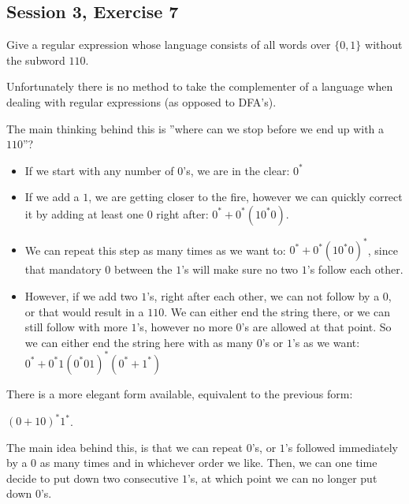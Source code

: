 \subsection{Session 3, Exercise 7}


Give a regular expression whose language consists of all words over $\{0,1\}$ without the subword $110$.


Unfortunately there is no method to take the complementer of a language when dealing with regular expressions (as opposed to DFA's).

The main thinking behind this is ''where can we stop before we end up with a $110$''?

\begin{itemize}
    \item If we start with any number of $0$'s, we are in the clear: $0^*$
    \item If we add a $1$, we are getting closer to the fire, however we can quickly correct it by adding at least one $0$ right after: $0^*+0^*(10^*0)$.
    \item We can repeat this step as many times as we want to: $0^*+0^*(10^*0)^*$, since that mandatory $0$ between the $1$'s will make sure no two $1$'s follow each other.
    \item However, if we add two $1$'s, right after each other, we can not follow by a $0$, or that would result in a $110$. We can either end the string there, or we can still follow with more $1$'s, however no more $0$'s are allowed at that point. So we can either end the string here with as many $0$'s or $1$'s as we want: $0^*+0^*1(0^*01)^*(0^*+1^*)$
\end{itemize}

There is a more elegant form available, equivalent to the previous form:

$(0+10)^*1^*$.

The main idea behind this, is that we can repeat $0$'s, or $1$'s followed immediately by a $0$ as many times and in whichever order we like. Then, we can one time decide to put down two consecutive $1$'s, at which point we can no longer put down $0$'s.